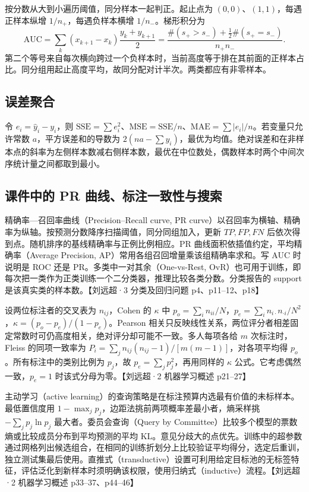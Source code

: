 \documentclass[UTF8,a4paper,zihao=-4,fontset=fandol]{ctexrep}
\begin{document}
按分数从大到小遍历阈值，同分样本一起判正。起止点为 \((0,0)\)、\((1,1)\)，每遇正样本纵增 \(1/n_+\)，每遇负样本横增 \(1/n_-\)。梯形积分为
\[
 \mathrm{AUC}=\sum_k (x_{k+1}-x_k)\frac{y_k+y_{k+1}}2
 =\frac{\#(s_+>s_-)+\tfrac12\#(s_+=s_-)}{n_+n_-}.
\]
第二个等号来自每次横向跨过一个负样本时，当前高度等于排在其前面的正样本占比。同分组用起止高度平均，故同分配对计半次。两类都应有非零样本。

\subsection*{误差聚合}
令 \(e_i=\hat y_i-y_i\)，则 \(\mathrm{SSE}=\sum e_i^2\)、\(\mathrm{MSE}=\mathrm{SSE}/n\)、\(\mathrm{MAE}=\sum|e_i|/n\)。若变量只允许常数 \(a\)，平方误差和的导数为 \(2(na-\sum y_i)\)，最优为均值。绝对误差和在非样本点的斜率为左侧样本数减右侧样本数，最优在中位数处，偶数样本时两个中间次序统计量之间都取到最小。

\subsection*{课件中的 PR 曲线、标注一致性与搜索}
精确率—召回率曲线（Precision–Recall curve, PR curve）以召回率为横轴、精确率为纵轴。按预测分数降序扫描阈值，同分同组加入，更新 $TP,FP,FN$ 后依次得到点。随机排序的基线精确率与正例比例相应。PR 曲线面积依插值约定，平均精确率（Average Precision, AP）常用各组召回增量乘该组精确率求和。写 AUC 时说明是 ROC 还是 PR。多类中一对其余（One-vs-Rest, OvR）也可用于训练，即每次把一类作为正类训练一个二分类器，推理比较各类分数。分类报告的 support 是该真实类的样本数。【刘远超·3 分类及回归问题 p4、p11–12、p18】

设两位标注者的交叉表为 $n_{ij}$，Cohen 的 $\kappa$ 中 $p_o=\sum_i n_{ii}/N$，$p_e=\sum_i n_{i\cdot}n_{\cdot i}/N^2$，$\kappa=(p_o-p_e)/(1-p_e)$。Pearson 相关只反映线性关系，两位评分者相差固定常数时可仍高度相关，绝对评分却可能不一致。多人每项各给 $m$ 次标注时，Fleiss 的同项一致率为 $P_i=\sum_j n_{ij}(n_{ij}-1)/[m(m-1)]$，对各项平均得 $p_o$。所有标注中的类别比例为 $p_j$，故 $p_e=\sum_jp_j^2$，再用同样的 $\kappa$ 公式。它考虑偶然一致，$p_e=1$ 时该式分母为零。【刘远超·2 机器学习概述 p21–27】

主动学习（active learning）的查询策略是在标注预算内选最有价值的未标样本。最低置信度用 $1-\max_jp_j$，边距法挑前两项概率差最小者，熵采样挑 $-\sum_jp_j\ln p_j$ 最大者。委员会查询（Query by Committee）比较多个模型的票数熵或比较成员分布到平均预测的平均 KL。意见分歧大的点优先。训练中的超参数通过网格列出候选组合，在相同的训练折划分上比较验证平均得分，选定后重训，独立测试集最后使用。直推式（transductive）设置可利用给定目标池的无标签特征，评估泛化到新样本时须明确该权限，使用归纳式（inductive）流程。【刘远超·2 机器学习概述 p33–37、p44–46】
\end{document}
